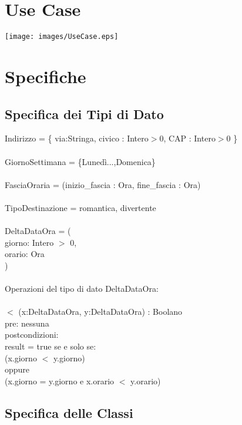 \documentclass[12pt, letterpaper]{article}
\newcommand{\acc}{\\\hphantom{}\\}
\begin{document}
\section{Use Case}\begin{center}

    \texttt{[image: images/UseCase.eps]}
\end{center}
\newpage
\section{Specifiche}
\subsection{Specifica dei Tipi di Dato}
Indirizzo = \{   via:Stringa,   civico  :  Intero$>$0,    CAP : Intero$>$0  \}\acc
GiornoSettimana = \{Lunedì...,Domenica\}\acc
FasciaOraria = (inizio\_fascia : Ora, fine\_fascia : Ora)\acc 
TipoDestinazione = {romantica, divertente}\acc
DeltaDataOra = (\\
\hphantom{ident}giorno: Intero $>$ 0,\\
\hphantom{ident}orario: Ora	\\
)\acc
Operazioni del tipo di dato DeltaDataOra:\acc
\hphantom{ident}$<$ (x:DeltaDataOra, y:DeltaDataOra) : Boolano\\
\hphantom{ident}\hphantom{ident}pre: nessuna\\
\hphantom{ident}\hphantom{ident}postcondizioni:\\
\hphantom{ident}\hphantom{ident}result = true se e solo se:\\
\hphantom{ident}\hphantom{ident}(x.giorno $<$ y.giorno)\\
\hphantom{ident}\hphantom{ident}oppure\\
\hphantom{ident}\hphantom{ident}(x.giorno = y.giorno e x.orario $<$ y.orario)
\subsection{Specifica delle Classi}
\end{document}
